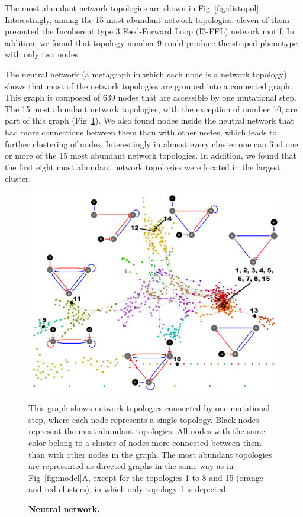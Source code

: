 \documentclass[10pt,letterpaper]{article}
\begin{document}
The most abundant network topologies are shown in Fig~\ref{fig:distopol}.
Interestingly, among the 15 most abundant network topologies, eleven of them
presented the Incoherent type 3 Feed-Forward Loop (I3-FFL) network motif. In
addition, we found that topology number 9 could produce the striped phenotype
with only two nodes.

The neutral network (a metagraph in which each node is a network topology)
shows that most of the network topologies are grouped into a connected graph.
This graph is composed of 639 nodes that are accessible by one mutational step.
The 15 most abundant network topologies, with the exception of
number 10, are part of this graph (Fig~\ref{fig:neutral-network}). We also
found nodes inside the neutral network that had more connections between them
than with other nodes, which leads to further clustering of nodes. Interestingly in
almost every cluster one can find one or more of the 15 most abundant network
topologies. In addition, we found that the first eight most abundant network
topologies were located in the largest cluster.

\begin{figure}[!h]
 \includegraphics[width=\textwidth]{figures/results/Fig3}
 \caption{\bf Neutral network.}
 This graph shows network topologies connected by one mutational step, where
 each node represents a single topology. Black nodes represent the most
 abundant topologies. All nodes with the same
 color belong to a cluster of nodes more connected between them than with other
 nodes in the graph. The most abundant topologies are represented as
 directed graphs in the same way as in Fig~\ref{fig:model}A, except for
 the topologies 1 to 8 and 15 (orange and red clusters), in which only
 topology 1 is depicted.
 \label{fig:neutral-network}
\end{figure}
\end{document}
